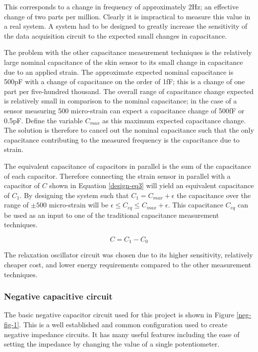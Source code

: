 This corresponds to a change in frequency of approximately 2Hz; an effective change of two parts per million.  Clearly it is impractical to measure this value in a real system.  A system had to be designed to greatly increase the sensitivity of the data acquisition circuit to the expected small changes in capacitance.

The problem with the other capacitance measurement techniques is the relatively large nominal capacitance of the skin sensor to its small change in capacitance due to an applied strain.  The approximate expected nominal capacitance is 500pF with a change of capacitance on the order of 1fF; this is a change of one part per five-hundred thousand.  The overall range of capacitance change expected is relatively small in comparison to the nominal capacitance; in the case of a sensor measuring 500 micro-strain can expect a capacitance change of 500fF or 0.5pF.  Define the variable $C_{max}$ as this maximum expected capacitance change.  The solution is therefore to cancel out the nominal capacitance such that the only capacitance contributing to the measured frequency is the capacitance due to strain.

The equivalent capacitance of capacitors in parallel is the sum of the capacitance of each capacitor.  Therefore connecting the strain sensor in parallel with a capacitor of $C$ shown in Equation \ref{design-eq3} will yield an equivalent capacitance of $C_1$.  By designing the system such that $C_1=C_{max}+\epsilon$ the capacitance over the range of $\pm500$ micro-strain will be $\epsilon\leq C_{eq} \leq C_{max}+\epsilon$.  This capacitance $C_{eq}$ can be used as an input to one of the traditional capacitance measurement techniques.

\begin{equation}
	C=C_1-C_0\label{design-eq3}
\end{equation} 

The relaxation oscillator circuit was chosen due to its higher sensitivity, relatively cheaper cost, and lower energy requirements compared to the other measurement techniques.

\subsubsection{Negative capacitive circuit}
The basic negative capacitor circuit used for this project is shown in Figure \ref{neg-fig-1}.  This is a well established and common configuration used to create negative impedance circuits.  It has many useful features including the ease of setting the impedance by changing the value of a single potentiometer.

